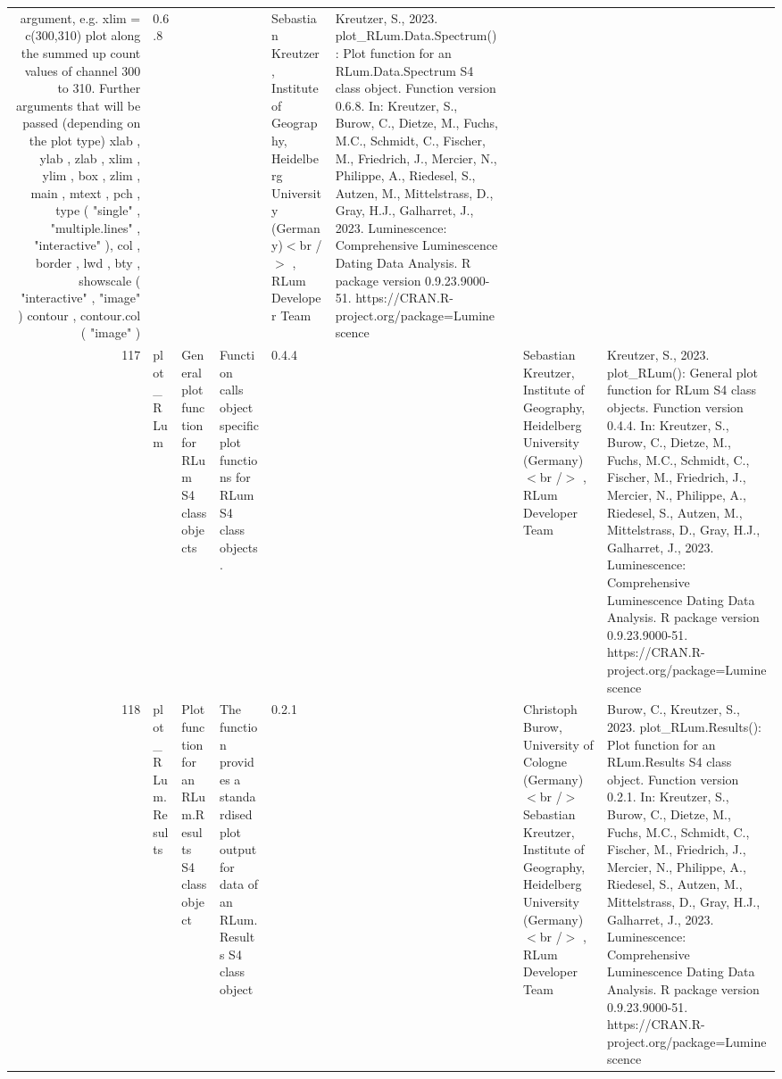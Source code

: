 \begin{table}[ht]
\begin{tabular}{rllllllll}
argument, e.g. xlim = c(300,310)  plot along the summed up count values of channel 300 to 310.  Further arguments that will be passed (depending on the plot type)   xlab ,  ylab ,  zlab ,  xlim ,  ylim ,  box , zlim ,  main ,  mtext ,  pch ,  type  ( "single" ,  "multiple.lines" ,  "interactive" ), col ,  border ,  lwd ,  bty ,  showscale  ( "interactive" ,  "image" ) contour ,  contour.col  ( "image" ) & 0.6.8
 &  &  & Sebastian Kreutzer, Institute of Geography, Heidelberg University (Germany)$<$br /$>$ , RLum Developer Team & Kreutzer, S., 2023. plot\_RLum.Data.Spectrum(): Plot function for an RLum.Data.Spectrum S4 class object. Function version 0.6.8. In: Kreutzer, S., Burow, C., Dietze, M., Fuchs, M.C., Schmidt, C., Fischer, M., Friedrich, J., Mercier, N., Philippe, A., Riedesel, S., Autzen, M., Mittelstrass, D., Gray, H.J., Galharret, J., 2023. Luminescence: Comprehensive Luminescence Dating Data Analysis. R package version 0.9.23.9000-51. https://CRAN.R-project.org/package=Luminescence
 \\ 
  117 & plot\_RLum & General plot function for RLum S4 class objects & Function calls object specific plot functions for RLum S4 class objects. & 0.4.4
 &  &  & Sebastian Kreutzer, Institute of Geography, Heidelberg University (Germany)$<$br /$>$ , RLum Developer Team & Kreutzer, S., 2023. plot\_RLum(): General plot function for RLum S4 class objects. Function version 0.4.4. In: Kreutzer, S., Burow, C., Dietze, M., Fuchs, M.C., Schmidt, C., Fischer, M., Friedrich, J., Mercier, N., Philippe, A., Riedesel, S., Autzen, M., Mittelstrass, D., Gray, H.J., Galharret, J., 2023. Luminescence: Comprehensive Luminescence Dating Data Analysis. R package version 0.9.23.9000-51. https://CRAN.R-project.org/package=Luminescence
 \\ 
  118 & plot\_RLum.Results & Plot function for an RLum.Results S4 class object & The function provides a standardised plot output for data of an RLum.Results S4 class object & 0.2.1
 &  &  & Christoph Burow, University of Cologne (Germany)  $<$br /$>$ Sebastian Kreutzer, Institute of Geography, Heidelberg University (Germany)$<$br /$>$ , RLum Developer Team & Burow, C., Kreutzer, S., 2023. plot\_RLum.Results(): Plot function for an RLum.Results S4 class object. Function version 0.2.1. In: Kreutzer, S., Burow, C., Dietze, M., Fuchs, M.C., Schmidt, C., Fischer, M., Friedrich, J., Mercier, N., Philippe, A., Riedesel, S., Autzen, M., Mittelstrass, D., Gray, H.J., Galharret, J., 2023. Luminescence: Comprehensive Luminescence Dating Data Analysis. R package version 0.9.23.9000-51. https://CRAN.R-project.org/package=Luminescence

\end{tabular}
\end{table}
